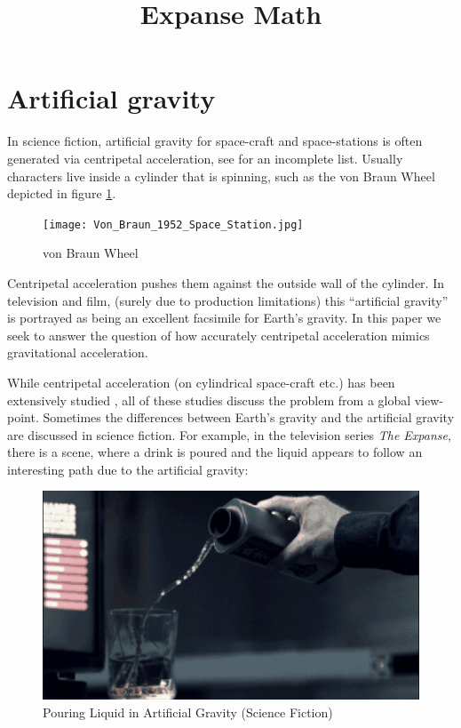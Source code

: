\documentclass{amsart}
\title{Expanse Math}
\theoremstyle{definition}
\begin{document}
\maketitle

\section{Artificial gravity}

In science fiction, artificial gravity for space-craft and
space-stations is often generated via centripetal acceleration, see
\cite{2001,2010,missiontomars,themartian,expanse,babylon5,europareport,ringworld?,rama,intersetller,etc}
for an incomplete list. Usually characters live inside a cylinder that
is spinning, such as the von Braun Wheel depicted in figure
\ref{fig:Braun Wheel}.

\begin{figure}[h]
  \centering
  \texttt{[image: Von\_Braun\_1952\_Space\_Station.jpg]}
  \caption{von Braun Wheel}
  \label{fig:Braun Wheel}
\end{figure}

Centripetal acceleration pushes them against the outside wall of the
cylinder. In television and film, (surely due to production
limitations) this ``artificial gravity'' is portrayed as being an
excellent facsimile for Earth's gravity. In this paper we seek to
answer the question of how accurately centripetal acceleration mimics
gravitational acceleration.


While centripetal acceleration (on cylindrical space-craft etc.) has
been extensively studied \cite{papers,anotherpaper}, all of these
studies discuss the problem from a global view-point. Sometimes the
differences between Earth's gravity and the artificial gravity are
discussed in science fiction. For example, in the television series
\textit{The Expanse}, there is a scene, where a drink is poured and
the liquid appears to follow an interesting path due to the artificial
gravity:

\begin{figure}
	\centering
	\includegraphics[width=0.7\linewidth]{pour.png}
	\caption{Pouring Liquid in Artificial Gravity (Science Fiction)}
	\label{fig:pour}
\end{figure}
\end{document}
